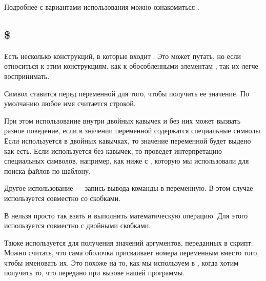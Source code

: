 \documentclass[letterpaper,10pt,russian]{sphinxmanual}
\begin{document}
\sphinxAtStartPar
{}

\sphinxAtStartPar
Подробнее с вариантами использования  можно ознакомиться .


\subsection{\$}
\label{\detokenize{educational_materials/bash/content:id3}}
\sphinxAtStartPar
Есть несколько конструкций, в которые входит \sphinxcode{\sphinxupquote{\$}}. Это может путать, но если относиться к этим конструкциям, как к обособленными элементам , так их легче воспринимать.

\sphinxAtStartPar
Символ \sphinxcode{\sphinxupquote{\$}} ставится перед переменной для того, чтобы получить ее значение. По умолчанию любое имя считается строкой.

\sphinxAtStartPar
{}

\sphinxAtStartPar
При этом использование \sphinxcode{\sphinxupquote{\$}} внутри двойных кавычек и без них может вызвать разное поведение, если в значении переменной содержатся специальные символы. Если \sphinxcode{\sphinxupquote{\$}} используется в двойных кавычках, то значение переменной будет выдено как есть. Если \sphinxcode{\sphinxupquote{\$}} используется без кавычек, то  проведет интерпретацию специальных символов, например, как ниже с \sphinxcode{\sphinxupquote{*}}, которую мы использовали для поиска файлов по шаблону.

\sphinxAtStartPar
Другое использование \sphinxcode{\sphinxupquote{\$}} — запись вывода команды в переменную. В этом случае \sphinxcode{\sphinxupquote{\$}} используется совместно со скобками.

\sphinxAtStartPar
{}

\sphinxAtStartPar
В  нельзя просто так взять и выполнить математическую операцию. Для этого используется \sphinxcode{\sphinxupquote{\$}} совместно с двойными скобками.

\sphinxAtStartPar
{}

\sphinxAtStartPar
Также \sphinxcode{\sphinxupquote{\$}} используется для получения значений аргументов, переданных в скрипт. Можно считать, что сама оболочка присваивает номера переменным вместо того, чтобы именовать их. Это похоже на то, как мы используем  в , когда хотим получить то, что передано при вызове нашей программы.
\end{document}
